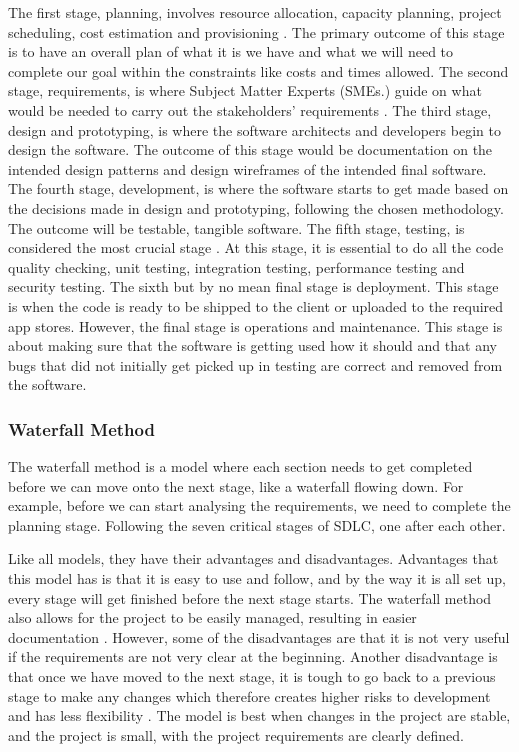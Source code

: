 \documentclass[a4paper,10pt]{article}
\begin{document}
The first stage, planning, involves resource allocation, capacity planning, project scheduling, cost estimation and provisioning \cite{SDLC}. The primary outcome of this stage is to have an overall plan of what it is we have and what we will need to complete our goal within the constraints like costs and times allowed. The second stage, requirements, is where Subject Matter Experts (SMEs.) guide on what would be needed to carry out the stakeholders' requirements \cite{SDLC}. The third stage, design and prototyping, is where the software architects and developers begin to design the software. The outcome of this stage would be documentation on the intended design patterns and design wireframes of the intended final software. The fourth stage, development, is where the software starts to get made based on the decisions made in design and prototyping, following the chosen methodology. The outcome will be testable, tangible software. The fifth stage, testing, is considered the most crucial stage \cite{SDLC}. At this stage, it is essential to do all the code quality checking, unit testing, integration testing, performance testing and security testing. The sixth but by no mean final stage is deployment. This stage is when the code is ready to be shipped to the client or uploaded to the required app stores. However, the final stage is operations and maintenance. This stage is about making sure that the software is getting used how it should and that any bugs that did not initially get picked up in testing are correct and removed from the software. 

\subsubsection{Waterfall Method}
The waterfall method is a model where each section needs to get completed before we can move onto the next stage, like a waterfall flowing down. For example, before we can start analysing the requirements, we need to complete the planning stage. Following the seven critical stages of SDLC, one after each other.

Like all models, they have their advantages and disadvantages. Advantages that this model has is that it is easy to use and follow, and by the way it is all set up, every stage will get finished before the next stage starts. The waterfall method also allows for the project to be easily managed, resulting in easier documentation \cite{cscm01slidesl5}. However, some of the disadvantages are that it is not very useful if the requirements are not very clear at the beginning. Another disadvantage is that once we have moved to the next stage, it is tough to go back to a previous stage to make any changes which therefore creates higher risks to development and has less flexibility \cite{cscm01slidesl5}. The model is best when changes in the project are stable, and the project is small, with the project requirements are clearly defined.
\end{document}
